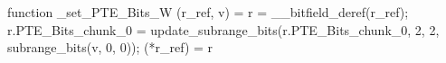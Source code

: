 function _set_PTE_Bits_W (r_ref, v) = {
    r = __bitfield_deref(r_ref);
    r.PTE_Bits_chunk_0 = update_subrange_bits(r.PTE_Bits_chunk_0, 2, 2, subrange_bits(v, 0, 0));
    (*r_ref) = r
}
